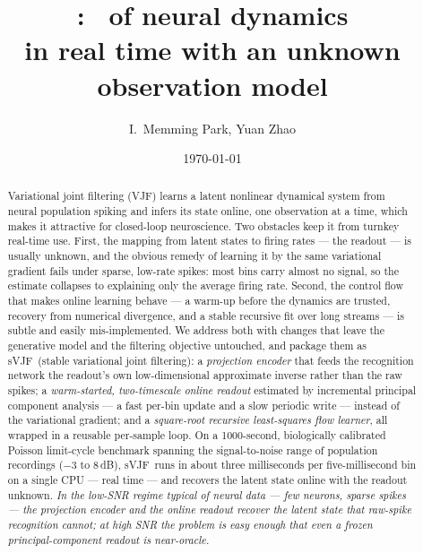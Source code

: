 \documentclass[11pt]{article}
\title{\svjf: \svjflong\ of neural dynamics\\ in real time with an unknown observation model}
\author{I.~Memming Park, Yuan Zhao}
\date{\today}
\newcommand{\svjf}{sVJF}
\newcommand{\svjflong}{stable variational joint filtering}
\begin{document}
\maketitle

\begin{abstract}
Variational joint filtering (VJF) learns a latent nonlinear dynamical system from neural
population spiking and infers its state online, one observation at a time, which makes it
attractive for closed-loop neuroscience. Two obstacles keep it from turnkey real-time use.
First, the mapping from latent states to firing rates --- the readout --- is usually unknown, and
the obvious remedy of learning it by the same variational gradient fails under sparse, low-rate
spikes: most bins carry almost no signal, so the estimate collapses to explaining only the
average firing rate. Second, the control flow that makes online learning behave --- a warm-up
before the dynamics are trusted, recovery from numerical divergence, and a stable recursive fit
over long streams --- is subtle and easily mis-implemented. We address both with changes that
leave the generative model and the filtering objective untouched, and package them as \svjf\
(\svjflong): a \emph{projection encoder} that feeds the recognition network the readout's own
low-dimensional approximate inverse rather than the raw spikes; a \emph{warm-started,
two-timescale online readout} estimated by incremental principal component analysis --- a fast
per-bin update and a slow periodic write --- instead of the variational gradient; and a
\emph{square-root recursive least-squares flow learner}, all wrapped in a reusable per-sample
loop. On a 1000-second, biologically calibrated Poisson limit-cycle benchmark spanning the
signal-to-noise range of population recordings ($-3$ to $8$\,dB), \svjf\ runs in about three
milliseconds per five-millisecond bin on a single CPU --- real time --- and recovers the latent
state online with the readout unknown. \emph{In the low-SNR regime typical of neural data --- few neurons, sparse spikes --- the
projection encoder and the online readout recover the latent state that raw-spike recognition
cannot; at high SNR the problem is easy enough that even a frozen principal-component readout is
near-oracle.}
\end{abstract}
\end{document}
